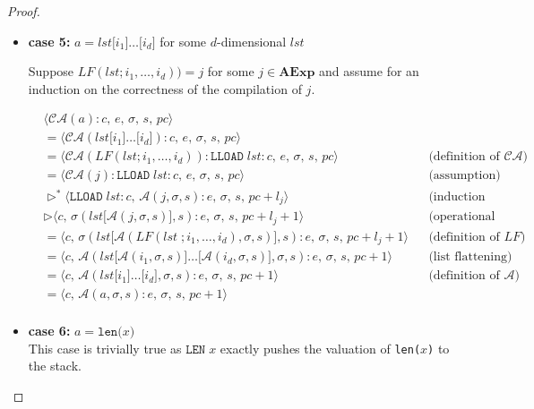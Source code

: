 \documentclass{article}
\begin{document}
\begin{proof}
\begin{itemize}
  \item \textbf{case 5: } $a = lst\texttt{[$i_1$]}\dots\texttt{[$i_d$]}$ for some $d$-dimensional $lst$

  Suppose $\mathit{LF}(lst; i_1, \dots, i_d)) = j$ for some $j \in \textbf{AExp}$ and assume for an induction on the correctness of the compilation of $j$. 

    \[
      \begin{aligned}
        &\langle  \mathcal{CA}(a) : c,\, e,\, \sigma,\, s,\, pc \rangle \\
        &= \langle \mathcal{CA}(lst\texttt{[$i_1$]}\dots\texttt{[$i_d$]}) : c,\, e,\, \sigma,\, s,\, pc \rangle \\
        &= \langle \mathcal{CA}(\mathit{LF}(lst; i_1, \dots, i_d)) : \texttt{LLOAD}\;lst : c,\, e,\, \sigma,\, s,\, pc \rangle 
        && \text{(definition of } \mathcal{CA}\text{)} \\
        &= \langle \mathcal{CA}(j) : \texttt{LLOAD}\;lst : c,\, e,\, \sigma,\, s,\, pc \rangle 
        && \text{(assumption)} \\
        &\triangleright^\ast \langle \texttt{LLOAD}\;lst : c,\, \mathcal{A}(j, \sigma, s):  e,\, \sigma,\, s,\, pc + l_j \rangle 
        && \text{(induction hypothesis)} \\
        &\triangleright \langle c,\, \sigma(lst\texttt{[$\mathcal{A}(j, \sigma, s)$]}, s):  e,\, \sigma,\, s,\, pc + l_j + 1 \rangle
        && \text{(operational semantics)} \\
        &= \langle c,\, \sigma(lst\texttt{[$\mathcal{A}(\mathit{LF}(lst\;; i_1, \dots, i_d), \sigma, s)$]}, s):  e,\, \sigma,\, s,\, pc + l_j + 1 \rangle
        && \text{(definition of } \mathit{LF}\text{)} \\
        &= \langle c,\, \mathcal{A}(lst\texttt{[$\mathcal{A}(i_1, \sigma, s)$]}\dots\texttt{[$\mathcal{A}(i_d, \sigma, s)$]}, \sigma, s) : e,\, \sigma,\, s,\, pc+1 \rangle
        && \text{(list flattening)} \\
        &= \langle c,\, \mathcal{A}(lst\texttt{[$i_1$]}\dots\texttt{[$i_d$]}, \sigma, s) : e,\, \sigma,\, s,\, pc+1 \rangle
        && \text{(definition of } \mathcal{A}\text{)} \\
        &= \langle c,\, \mathcal{A}(a, \sigma, s) : e,\, \sigma,\, s,\, pc+1 \rangle \\
      \end{aligned}
  \]

    \item \textbf{case 6: } $a = \texttt{len($x$)}$ \\
    This case is trivially true as $\texttt{LEN}\;x$ exactly pushes the valuation of \texttt{len($x$)} to the stack.


\end{itemize}
\end{proof}
\end{document}
